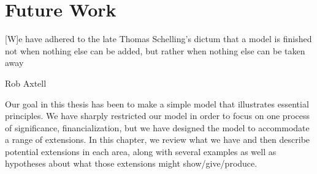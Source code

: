 \chapter[Future Work]{Future Work} \label{appendix-future-work}

\epigraph{[W]e have adhered to the late Thomas Schelling’s dictum that a model is finished not when nothing else can be added, but rather when nothing else can be taken away}{Rob Axtell \cite{axtellDynamicsFirmsData2024}}


Our goal in this thesis has been to make a simple model that illustrates essential principles. %
We have sharply restricted our model  in order to focus on one process of significance, financialization, but we have designed the model to accommodate a range of extensions.  In this chapter, we review what we have and then describe potential extensions in each area, along with several examples as well as hypotheses about what those extensions might show/give/produce. 

